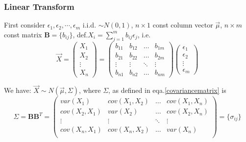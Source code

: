 \subsubsection{Linear Transform}
    First consider $\epsilon_1,\epsilon_2,\cdots,\epsilon_m$ i.i.d. $\sim N(0,1)$, $n\times 1$ const column vector $\vec{\mu}$, $n\times m$ const matrix $\mathbf{B}=\{b_{ij}\}$, def.$X_i={\displaystyle\sum_{j=1}^m b_{ij}\epsilon_j}$, i.e.
    \[
        \vec{X}=
        \begin{pmatrix}
            X_1\\X_2\\ \vdots\\X_n
        \end{pmatrix}
        =
        \begin{pmatrix}
            b_{11}&b_{12}&\ldots&b_{1m}\\
            b_{21}&b_{22}&\ldots&b_{2m}\\
            \vdots&\vdots&\ddots&\vdots\\
            b_{n1}&b_{n2}&\ldots&b_{nm}
        \end{pmatrix}
        \begin{pmatrix}
            \epsilon_1\\
            \epsilon_2\\
            \vdots\\
            \epsilon_m
        \end{pmatrix}
    \]

    
    We have: $\vec{X}\sim N(\vec{\mu},\Sigma)$, where $\Sigma$, as defined in eqa.\ref{covariancematrix} is
    \[
        \Sigma=\mathbf{BB}^T=
        \begin{pmatrix}
        var(X_1) & cov(X_1,X_2) & \ldots & cov(X_1,X_n)\\
        cov(X_2,X_1) & var(X_2) & \ldots & cov(X_2,X_n)\\
        \vdots & \vdots & \ddots & \vdots\\
        cov(X_n,X_1) & cov(X_n,X_2) & \ldots & var(X_n)\\
        \end{pmatrix}  
        =\{\sigma_{ij}\}  
    \]

